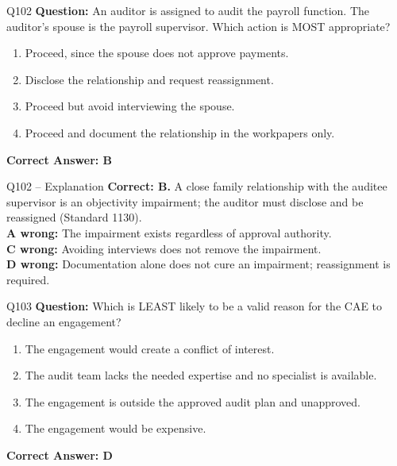 \documentclass[aspectratio=169,10pt]{beamer}
\begin{document}
	\begin{frame}[t]{Q102}
		\small
		\textbf{Question:} An auditor is assigned to audit the payroll function. The auditor's spouse is the payroll supervisor. Which action is MOST appropriate?
		\begin{enumerate}[label=\Alph*.,itemsep=1pt,topsep=2pt]
			\item Proceed, since the spouse does not approve payments.
			\item Disclose the relationship and request reassignment.
			\item Proceed but avoid interviewing the spouse.
			\item Proceed and document the relationship in the workpapers only.
		\end{enumerate}
		\vspace{4pt}
		\textbf{Correct Answer: B}
	\end{frame}
	
	\begin{frame}[t]{Q102 -- Explanation}
		\small
		\textbf{Correct: B.} A close family relationship with the auditee supervisor is an objectivity impairment; the auditor must disclose and be reassigned (Standard 1130). \\[4pt]
		\textbf{A wrong:} The impairment exists regardless of approval authority. \\[2pt]
		\textbf{C wrong:} Avoiding interviews does not remove the impairment. \\[2pt]
		\textbf{D wrong:} Documentation alone does not cure an impairment; reassignment is required.
	\end{frame}
	
	\begin{frame}[t]{Q103}
		\small
		\textbf{Question:} Which is LEAST likely to be a valid reason for the CAE to decline an engagement?
		\begin{enumerate}[label=\Alph*.,itemsep=1pt,topsep=2pt]
			\item The engagement would create a conflict of interest.
			\item The audit team lacks the needed expertise and no specialist is available.
			\item The engagement is outside the approved audit plan and unapproved.
			\item The engagement would be expensive.
		\end{enumerate}
		\vspace{4pt}
		\textbf{Correct Answer: D}
	\end{frame}
	
\end{document}
